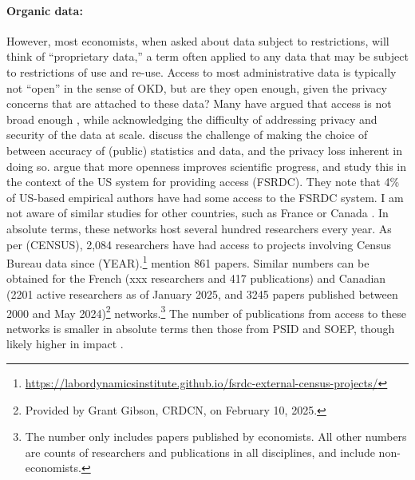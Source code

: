 \documentclass{article}
\begin{document}
\paragraph{Organic data:} However, most economists, when asked about data subject to restrictions, will think of ``proprietary data,'' a term often applied to any data that may be subject to restrictions of use and re-use. Access to most administrative data is typically not ``open'' in the sense of OKD, but are they open enough, given the privacy concerns that are attached to these data? Many have argued that access is not broad enough \citep{card_expanding_2010,einav_economics_2014}, while acknowledging the difficulty of addressing privacy and security of the data at scale. \citet{abowd_economic_2018} discuss the challenge of making the choice of between accuracy of (public) statistics and data, and the privacy loss inherent in doing so. \citet{nagaraj_improving_2020} argue that more openness improves scientific progress, and \citet{nagaraj_how_2023} study this in the context of the US system for providing access (\ac{FSRDC}). They note that 4\% of US-based empirical authors have had some access to the FSRDC system. I am not aware of similar studies for other countries, such as France \citep[the equivalent system is the \ac{CASD}, ][]{gadouche_centre_2019} or Canada \citep{currie2015social}. In absolute terms, these networks host several hundred researchers every year. As per (CENSUS), 2,084 researchers have had access to projects involving Census Bureau data since (YEAR).\footnote{\url{https://labordynamicsinstitute.github.io/fsrdc-external-census-projects/}} \citet{nagaraj_how_2023} mention 861 papers. Similar numbers can be obtained for the French (xxx researchers and 417 publications)
and Canadian (2201  active researchers as of January 2025, and 3245 papers published between 2000 and May 2024)\footnote{Provided by Grant Gibson, CRDCN, on February 10, 2025.} networks.\footnote{The \citet{nagaraj_how_2023} number only includes papers published by economists. All other numbers are counts of researchers and publications in all disciplines, and include non-economists.} The number of publications from access to these networks is smaller in absolute terms then those from PSID and SOEP, though likely higher in impact \citep{nagaraj_how_2023}.
\end{document}
